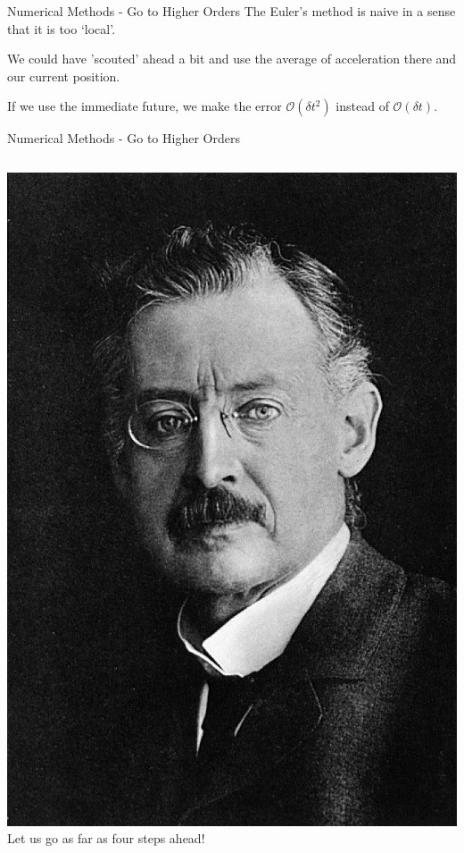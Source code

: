 \documentclass{beamer}
\begin{document}
\begin{frame}{Numerical Methods - Go to Higher Orders}
    The Euler's method is naive in a sense that it is too `local'.

    \vspace{0.5cm}

    We could have 'scouted' ahead a bit and use the average of acceleration there and our current position.

    \vspace{0.5cm}

    If we use the immediate future, we make the error $\mathcal{O}(\delta t^{2})$ instead of $\mathcal{O}(\delta t)$.
\end{frame}


\begin{frame}{Numerical Methods - Go to Higher Orders}
    \begin{columns}
        \centering
        \includegraphics[width=\textwidth]{asset/runge.jpg}
        \centering
        Let us go as far as four steps ahead!


\end{columns}
\end{frame}
\end{document}
